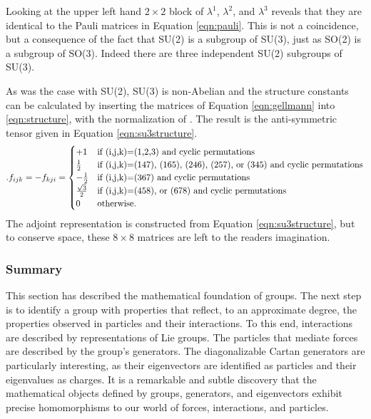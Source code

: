 Looking at the upper left hand $2\times2$ block of $\lambda^1$, $\lambda^2$, and $\lambda^3$ reveals that they are identical to the Pauli matrices in Equation \ref{eqn:pauli}.
This is not a coincidence, but a consequence of the fact that SU(2) is a subgroup of SU(3), just as SO(2) is a subgroup of SO(3).
Indeed there are three independent SU(2) subgroups of SU(3).

As was the case with SU(2), SU(3) is non-Abelian and the structure constants can be calculated by inserting the matrices of Equation \ref{eqn:gellmann} into \ref{eqn:structure}, with the normalization of \half. 
The result is the anti-symmetric tensor given in Equation \ref{eqn:su3structure}. \check
\begin{equation}
\begin{split}\label{eqn:su3structure}.
f_{ijk} =-f_{kji}= \begin{cases}
+1 &\text{if (i,j,k)=(1,2,3) and cyclic permutations}\\
\frac{1}{2} &\text{if (i,j,k)=(147), (165), (246), (257), or (345) and cyclic permutations}\\
-\frac{1}{2} &\text{if (i,j,k)=(367) and cyclic permutations}\\
\frac{\sqrt{3}}{2} &\text{if (i,j,k)=(458), or (678) and cyclic permutations}\\
0 &\text{otherwise.}
\end{cases} 
\end{split}
\end{equation} 
The adjoint representation is constructed from Equation \ref{eqn:su3structure}, but to conserve space, these $8\times8$ matrices are left to the readers imagination.

\subsubsection{Summary}

This section has described the mathematical foundation of groups.
The next step is to identify a group with properties that reflect, to an approximate degree, the properties observed in particles and their interactions.
To this end, interactions are described by representations of Lie groups.
The particles that mediate forces are described by the group's generators.
The diagonalizable Cartan generators are particularly interesting, as their eigenvectors are identified as particles and their eigenvalues as charges.
It is a remarkable and subtle discovery that the mathematical objects defined by groups, generators, and eigenvectors exhibit precise homomorphisms to our world of forces, interactions, and particles.
\cite{robinson}




